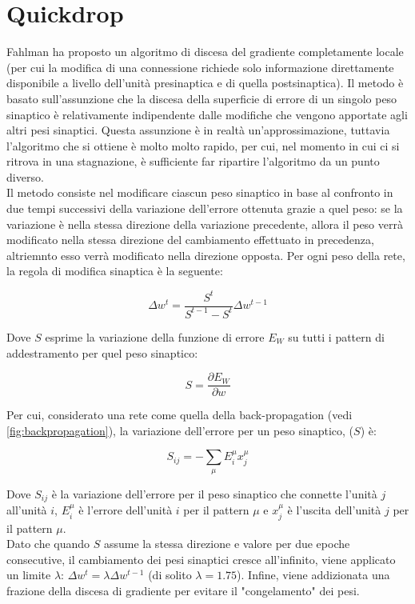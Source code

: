 \section{Quickdrop}

Fahlman ha proposto un algoritmo di discesa del gradiente completamente locale
(per cui la modifica di una connessione richiede solo informazione direttamente
disponibile a livello dell'unità presinaptica e di quella postsinaptica). Il
metodo è basato sull'assunzione che la discesa della superficie di errore di un
singolo peso sinaptico è relativamente indipendente dalle modifiche che vengono
apportate agli altri pesi sinaptici. Questa assunzione è in realtà
un'approssimazione, tuttavia l'algoritmo che si ottiene è molto molto rapido,
per cui, nel momento in cui ci si ritrova in una stagnazione, è sufficiente far
ripartire l'algoritmo da un punto diverso.\\
Il metodo consiste nel modificare ciascun peso sinaptico in base al confronto in
due tempi successivi della variazione dell'errore ottenuta grazie a quel peso:
se la variazione è nella stessa direzione della variazione precedente, allora il
peso verrà modificato nella stessa direzione del cambiamento effettuato in
precedenza, altriemnto esso verrà modificato nella direzione opposta. Per ogni
peso della rete, la regola di modifica sinaptica è la seguente:

\begin{equation}
	\Delta w^t = \frac{S^t}{S^{t-1} - S^t}\Delta w^{t-1}
\end{equation}

Dove $S$ esprime la variazione della funzione di errore $E_W$ su tutti i pattern
di addestramento per quel peso sinaptico:

\begin{equation}
	S = \frac{\partial E_W}{\partial w}
\end{equation}

Per cui, considerato una rete come quella della back-propagation (vedi
\autoref{fig:backpropagation}), la variazione dell'errore per un peso sinaptico,
($S$) è:

\begin{equation}
	S_{ij} = - \sum_{\mu} E^\mu_i x^\mu_j
\end{equation}

Dove $S_{ij}$ è la variazione dell'errore per il peso sinaptico che connette
l'unità $j$ all'unità $i$, $E^\mu_i$ è l'errore dell'unità $i$ per il pattern
$\mu$ e $x^\mu_j$ è l'uscita dell'unità $j$ per il pattern $\mu$.\\
Dato che quando $S$ assume la stessa direzione e valore per due epoche
consecutive, il cambiamento dei pesi sinaptici cresce all'infinito, viene
applicato un limite $\lambda$: $\Delta w^t = \lambda \Delta w^{t-1}$ (di solito
$\lambda = 1.75$). Infine, viene addizionata una frazione della discesa di
gradiente per evitare il "congelamento" dei pesi.
